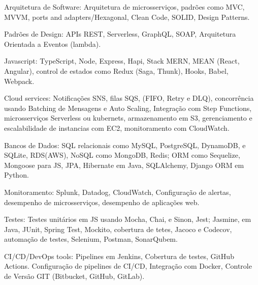 \documentclass[a4paper,10pt]{article}
\begin{document}
\vspace{1.5mm} \textcolor{corSubSection}{Arquitetura de Software:}
Arquitetura de microsserviços, 
padrões como MVC, MVVM, ports and adapters/Hexagonal,
Clean Code, SOLID, Design Patterns.

\vspace{1.5mm}\textcolor{corSubSection}{Padrões de Design:}
APIs REST, Serverless, GraphQL, SOAP,
Arquitetura Orientada a Eventos (lambda).

\vspace{1.5mm}\textcolor{corSubSection}{Javascript:}
TypeScript, Node, Express, Hapi,
Stack MERN, MEAN (React, Angular),
control de estados como Redux (Saga, Thunk), Hooks,
Babel, Webpack.

\vspace{1.5mm}\textcolor{corSubSection}{Cloud services:}
Notificações SNS,
filas SQS, (FIFO, Retry e DLQ),
concorrência usando Batching de Mensagens e Auto Scaling,
Integração com Step Functions,
microsserviços Serverless ou kubernets,
armazenamento em S3,
gerenciamento e escalabilidade de instancias com EC2,
monitoramento com CloudWatch.

\vspace{1.5mm}\textcolor{corSubSection}{Bancos de Dados:}
SQL relacionais como
MySQL, PostgreSQL, DynamoDB, e SQLite, RDS(AWS),
NoSQL como
MongoDB, Redis;
ORM como
Sequelize, Mongoose para JS,
JPA, Hibernate em Java, SQLAlchemy,
Django ORM em Python.

\vspace{1.5mm}\textcolor{corSubSection}{Monitoramento:}
Splunk, Datadog, CloudWatch,
Configuração de alertas,
desempenho de microsserviços,
desempenho de aplicações web.

\vspace{1.5mm}\textcolor{corSubSection}{Testes:}
Testes unitários em JS usando Mocha,
Chai, e Sinon, Jest; Jasmine,
em Java, JUnit, Spring Test, Mockito,
cobertura de tetes, Jacoco e Codecov,
automação de testes, Selenium, Postman,
SonarQubem.


\vspace{1.5mm}\textcolor{corSubSection}{CI/CD/DevOps tools:}
Pipelines em Jenkins,
Cobertura de testes,
GitHub Actions.
Configuração de pipelines de CI/CD,
Integração com Docker,
Controle de Versão GIT (Bitbucket, GitHub, GitLab).
\end{document}
